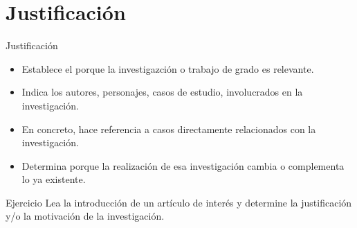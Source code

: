 \documentclass[
10pt,
aspectratio=169,
]{beamer}
\begin{document}
\section{Justificaci\'on}
\begin{frame}{Justificaci\'on}
\begin{itemize}
\item Establece el porque la investigazci\'on o trabajo de grado es relevante.
\item Indica los autores, personajes, casos de estudio, involucrados en la investigaci\'on.
\item En concreto, hace referencia a casos directamente relacionados con la investigaci\'on.
\item Determina porque la realizaci\'on de esa investigaci\'on cambia o complementa lo ya existente. 
\end{itemize}
\end{frame}

\begin{frame}{Ejercicio}
Lea la introducci\'on de un  art\'iculo de inter\'es y determine la justificaci\'on y/o la motivaci\'on de la investigaci\'on.
\end{frame}
\end{document}
